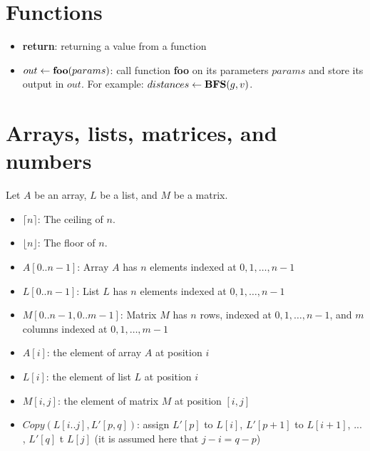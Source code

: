 \documentclass[10pt]{article}
\begin{document}
\section{Functions}
\begin{itemize}
\item {\color{blue} {\bf return}}: returning a value from a function
\item {\color{blue} $out \leftarrow {\bf foo}(params)$}: call function {\bf foo} on its parameters $params$ and store its output in $out$. For example: $distances \leftarrow {\bf BFS}(g, v)$. 
\end{itemize}

\section{Arrays, lists,  matrices, and numbers} 
Let $A$ be an array, $L$ be a list, and $M$ be a matrix. 
\begin{itemize}
\item {\color{blue} $\lceil n \rceil$}: The ceiling of $n$. 
\item {\color{blue} $\lfloor n \rfloor$}: The floor of $n$. 
\item {\color{blue} $A[0..n-1]$}: Array $A$ has $n$ elements indexed at $0,1,\ldots,n-1$
\item {\color{blue} $L[0..n-1]$}: List $L$ has $n$ elements indexed at $0,1,\ldots,n-1$
\item {\color{blue} $M[0..n-1,0..m-1]$}: Matrix $M$ has $n$ rows, indexed at $0,1,\ldots,n-1$, and $m$ columns indexed at $0,1,\ldots,m-1$
\item {\color{blue} $A[i]$}: the element of array $A$ at position $i$
\item {\color{blue} $L[i]$}: the element of list $L$ at position $i$
\item {\color{blue} $M[i,j]$}: the element of matrix $M$ at position $[i,j]$ 
\item {\color{blue} $Copy(L[i..j],L'[p,q])$}: assign $L'[p]$ to $L[i]$, $L'[p+1]$ to $L[i+1]$, ... , $L'[q]$ t $L[j]$ (it is assumed here that $j-i = q-p$)
\end{itemize}
\end{document}
